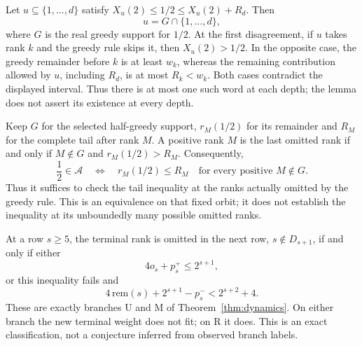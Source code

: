 \begin{lem}
\label{lem:straddle-agrees-greedy}
Let $u\subseteq\{1,\ldots,d\}$ satisfy
$X_u(2)\le1/2\le X_u(2)+R_d$.  Then
\[
 u=G\cap\{1,\ldots,d\},
\]
where $G$ is the real greedy support for $1/2$.
At the first disagreement, if $u$ takes rank $k$ and the greedy rule
skips it, then $X_u(2)>1/2$.  In the opposite case, the greedy
remainder before $k$ is at least $w_k$, whereas the remaining
contribution allowed by $u$, including $R_d$, is at most
$R_k<w_k$.  Both cases contradict the displayed interval.  Thus there is at most one such word
at each depth; the lemma does not assert its existence at every depth.
\end{lem}

\begin{thm}
\label{thm:last-skip-iff-fatal}
Keep $G$ for the selected half-greedy support, $r_M(1/2)$ for its
remainder and $R_M$ for the complete tail after rank $M$.
A positive rank $M$ is the last omitted rank if and only if
$M\notin G$ and $r_M(1/2)>R_M$.  Consequently,
\[
 \frac12\in\mathcal A
 \quad\Longleftrightarrow\quad
 r_M(1/2)\le R_M\quad\text{for every positive }M\notin G.
\]
Thus it suffices to check the tail inequality at the ranks actually
omitted by the greedy rule.  This is an equivalence on that fixed orbit;
it does not establish the inequality at its unboundedly many possible
omitted ranks.
\end{thm}

\begin{lem}
\label{lem:seam-upper-or-middle}
At a row $s\ge5$, the terminal rank is omitted in the next row,
$s\notin D_{s+1}$, if and only if either
\[
 4o_s+p_s^+\le2^{s+1},
\]
or this inequality fails and
\[
 4\,\mathrm{rem}(s)+2^{s+1}-p_s^-<2^{s+2}+4.
\]
These are exactly branches $\mathrm U$ and $\mathrm M$ of
Theorem~\ref{thm:dynamics}.  On either branch the new terminal weight
does not fit; on $\mathrm R$ it does.  This is an exact
classification, not a conjecture inferred from observed branch labels.
\end{lem}

